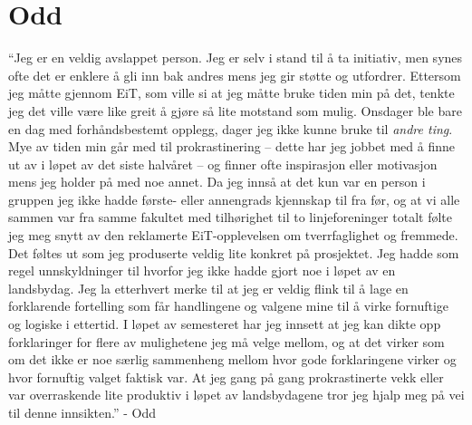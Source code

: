 \section{Odd}
``Jeg er en veldig avslappet person.
Jeg er selv i stand til å ta initiativ, men synes ofte det er enklere å gli inn bak andres mens jeg gir støtte og utfordrer.
Ettersom jeg måtte gjennom EiT, som ville si at jeg måtte bruke tiden min på det, tenkte jeg det ville være like greit å gjøre så lite motstand som mulig.
Onsdager ble bare en dag med forhåndsbestemt opplegg, dager jeg ikke kunne bruke til \textit{andre ting}.
Mye av tiden min går med til prokrastinering -- dette har jeg jobbet med å finne ut av i løpet av det siste halvåret -- og finner ofte inspirasjon eller motivasjon mens jeg holder på med noe annet.
Da jeg innså at det kun var en person i gruppen jeg ikke hadde første- eller annengrads kjennskap til fra før, og at vi alle sammen var fra samme fakultet med tilhørighet til to linjeforeninger totalt følte jeg meg snytt av den reklamerte EiT-opplevelsen om tverrfaglighet og fremmede.
Det føltes ut som jeg produserte veldig lite konkret på prosjektet.
Jeg hadde som regel unnskyldninger til hvorfor jeg ikke hadde gjort noe i løpet av en landsbydag.
Jeg la etterhvert merke til at jeg er veldig flink til å lage en forklarende fortelling som får handlingene og valgene mine til å virke fornuftige og logiske i ettertid.
I løpet av semesteret har jeg innsett at jeg kan dikte opp forklaringer for flere av mulighetene jeg må velge mellom, og at det virker som om det ikke er noe særlig sammenheng mellom hvor gode forklaringene virker og hvor fornuftig valget faktisk var.
At jeg gang på gang prokrastinerte vekk eller var overraskende lite produktiv i løpet av landsbydagene tror jeg hjalp meg på vei til denne innsikten.''
\hfill - Odd
\vspace{\secspace}
